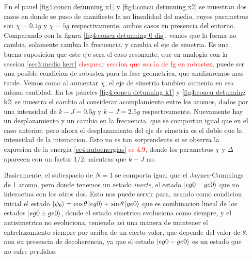 En el panel \ref{fig4:concu detunning x1} y \ref{fig4:concu detunning x2} se muestran dos casos en donde se puso de manifiesto la no linealidad del medio, cuyos parametros son $\chi=0.1g$ y $\chi=5g$ respectivamente, ambos casos en presencia del entorno. Comparando con la figura \ref{fig4:concu detunning 0 dis}, vemos que la forma no cambia, solamente cambia la frecuencia, y cambia el eje de simetria. Es una buena suposicion que este eje sera el caso resonante, que en analogia con la seccion \ref{sec3:medio kerr} \textcolor{red}{chequear seccion que sea la de fg en robustez}, puede ser una posible condicion de robustez para la fase geometrica, que analizaremos mas tarde. Vemos como al aumentar $\chi$, el eje de simetria tambien aumenta en esa misma cantidad. En los paneles \ref{fig4:concu detunning k1} y \ref{fig4:concu detunning k2} se muestra el cambio al considerar acomplamiento entre los atomos, dados por una intensidad de $k-J=0.5g$ y $k-J=2.5g$ respectivamente. Nuevamente hay un desplazamiento y un cambio en la frecuencia, que se comportan igual que en el caso anterior, pero ahora el desplazamiento del eje de simetria es el doble que la intensidad de la interaccion. Esto no es tan sorprendente si se observa la expresion de la energia \ref{ec4:autoenergias} \textcolor{red}{ec 4.9}, donde los parametros $\chi$ y $\Delta$ aparecen con un factor $1/2$, mientras que $k-J$ no. 

Basicamente, el subespacio de $N=1$ se comporta igual que el Jaynes-Cummings de 1 atomo, pero donde tenemos un estado \textit{inerte}, el estado $\ket{eg0-ge0}$ que no interactua con los otros dos. Esto nos puede servir para, usando como condicion inicial el estado $\ket{\psi_0}=\cos\theta\ket{eg0}+\sin\theta\ket{ge0}$ que es combinacion lineal de los estados $\ket{eg0\pm ge0}$, donde el estado simetrico evoluciona como siempre, y el antisimetrico no evoluciona, teniendo asi una manera de mantener el entrelazamiento siempre por arriba de un cierto valor, que depende del valor de $\theta$, aun en presencia de decoherencia, ya que el estado $\ket{eg0-ge0}$ es un estado que no sufre perdidas.

